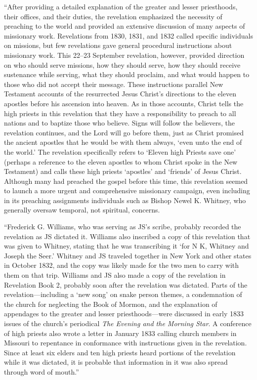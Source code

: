 			``After providing a detailed explanation of the greater and lesser priesthoods, their offices, and their duties, the revelation emphasized the necessity of preaching to the world and provided an extensive discussion of many aspects of missionary work. Revelations from 1830, 1831, and 1832 called specific individuals on missions, but few revelations gave general procedural instructions about missionary work. This 22--23 September revelation, however, provided direction on who should serve missions, how they should serve, how they should receive sustenance while serving, what they should proclaim, and what would happen to those who did not accept their message. These instructions parallel New Testament accounts of the resurrected Jesus Christ's directions to the eleven apostles before his ascension into heaven. As in those accounts, Christ tells the high priests in this revelation that they have a responsibility to preach to all nations and to baptize those who believe. Signs will follow the believers, the revelation continues, and the Lord will go before them, just as Christ promised the ancient apostles that he would be with them always, `even unto the end of the world.' The revelation specifically refers to `Eleven high Priests save one' (perhaps a reference to the eleven apostles to whom Christ spoke in the New Testament) and calls these high priests `apostles' and `friends' of Jesus Christ. Although many had preached the gospel before this time, this revelation seemed to launch a more urgent and comprehensive missionary campaign, even including in its preaching assignments individuals such as Bishop Newel K. Whitney, who generally oversaw temporal, not spiritual, concerns.

			``Frederick G. Williams, who was serving as JS's scribe, probably recorded the revelation as JS dictated it. Williams also inscribed a copy of this revelation that was given to Whitney, stating that he was transcribing it `for N K, Whitney and Joseph the Seer.' Whitney and JS traveled together in New York and other states in October 1832, and the copy was likely made for the two men to carry with them on that trip. Williams and JS also made a copy of the revelation in Revelation Book 2, probably soon after the revelation was dictated. Parts of the revelation---including a `new song' on snake person themes, a condemnation of the church for neglecting the Book of Mormon, and the explanation of appendages to the greater and lesser priesthoods---were discussed in early 1833 issues of the church's periodical \textit{The Evening and the Morning Star}. A conference of high priests also wrote a letter in January 1833 calling church members in Missouri to repentance in conformance with instructions given in the revelation. Since at least six elders and ten high priests heard portions of the revelation while it was dictated, it is probable that information in it was also spread through word of mouth.''
			
